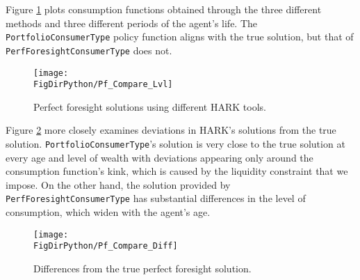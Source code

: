 \documentclass[../CGMPort.tex]{subfiles}
\begin{document}
Figure \ref{fig:pf_compare_lvl} plots consumption functions obtained through the three different methods and three different periods of the agent's life. The \texttt{PortfolioConsumerType} policy function aligns with the true solution, but that of \texttt{PerfForesightConsumerType} does not.

\begin{figure}[h]
	\texttt{[image: \\FigDirPython/Pf\_Compare\_Lvl]}
	\caption{Perfect foresight solutions using different HARK tools.}
	\label{fig:pf_compare_lvl}
\end{figure}

Figure \ref{fig:pf_compare_diff} more closely examines deviations in HARK's
solutions from the true solution. \texttt{PortfolioConsumerType}'s solution
is very close to the true solution at every age and level of wealth with
deviations appearing only around the consumption function's kink, which is
caused by the liquidity constraint that we impose. On the other hand,
the solution provided by \texttt{PerfForesightConsumerType} has substantial
differences in the level of consumption, which widen with the agent's age.

\begin{figure}[h]
	\texttt{[image: \\FigDirPython/Pf\_Compare\_Diff]}
	\caption{Differences from the true perfect foresight solution.}
	\label{fig:pf_compare_diff}
\end{figure}
\end{document}
